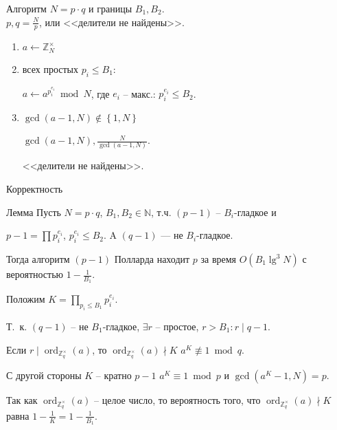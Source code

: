 \documentclass{beamer}
\begin{document}
\begin{frame}{Алгоритм}
 $N = p \cdot q$ и границы $B_1, B_2$.\\
 $p,q = \frac{N}{p}$, или <<делители не найдены>>.
    \begin{enumerate}
        \item $
        a\mathop  \leftarrow \mathbb{Z}_N^\times$
        \item {} всех простых ${p_i} \leqslant {B_1}$:
        
        \quad $a \leftarrow a^{p_i^{e_i}}\bmod N$, где $e_i$ -- макс.: $p_i^{e_i} \leqslant {B_2}$.
        
        \item {} $\gcd (a-1, N) \not  \in \left\{ {1,N} \right\}$
        
        \quad {} $\gcd (a-1, N), \frac{N}{\gcd (a-1, N)}$. 
        
        
        \quad {} <<делители не найдены>>.
    \end{enumerate}
\end{frame}

\begin{frame}{Корректность}
\begin{block}{Лемма}
    Пусть $N = p \cdot q$, $B_1,B_2 \in \mathbb{N}$, т.ч. $(p- 1)$ -- $B_i$-гладкое и 
    
    $p - 1 = \prod p_i^{e_i}$, $p_i^{e_i} \leqslant B_2$. A $(q-1)$ — не $B_i$-гладкое. 
    
    Тогда алгоритм $(p-1)$ Полларда находит $p$ за время $O( B_1 \lg^3 N)$ с вероятностью $1  - \frac{1}{B_1}$.
\end{block}
\vspace{1em}

\ProofBegin
Положим $K = \prod\limits_{p_i \leq  B_1}{p_i^{e_i}}$.

Т.~к. $(q-1)$ -- не $B_1$-гладкое, $\exists r$ -- простое, $r > B_1: r \mid q-1$.

Если $r \mid \operatorname{ord}_{\mathbb{Z}_q^\times}(a)$, то $\operatorname{ord}_{\mathbb{Z}_q^\times}(a) \nmid K$ \MyImplies $a^K \not\equiv 1 \bmod{q}$.

С другой стороны $K$ -- кратно $p-1$ \MyImplies $a^K \equiv 1 \bmod{p}$ и $\gcd(a^K - 1, N) = p$.


Так как $\operatorname{ord}_{\mathbb{Z}_q^\times}(a)$ -- целое число, то вероятность того, что $\operatorname{ord}_{\mathbb{Z}_q^\times}(a) \nmid K$ равна $1 -\frac{1}{K} = 1 - \frac{1}{B_1}$. 
\ProofEnd
\end{frame}
\end{document}
